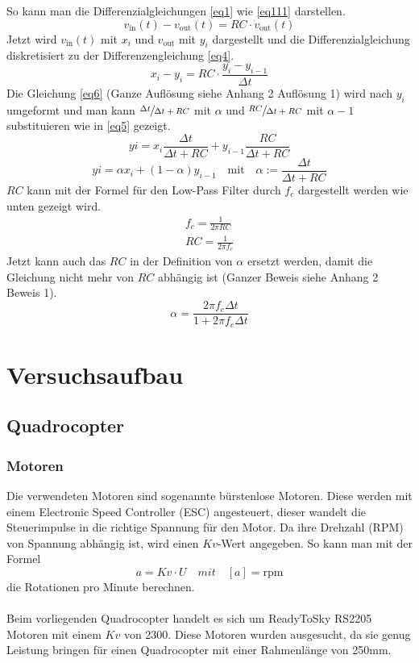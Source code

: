 \documentclass[12pt,a4paper, ngerman]{article}
\begin{document}
So kann man die Differenzialgleichungen \ref{eq1} wie \ref{eq111} darstellen.\\
\begin{equation} \label{eq111}
v_{\text{in}}(t)-v_{\text{out}}(t)=RC\cdot \dot{v}_{\text{out}}(t)
\end{equation}
Jetzt wird $v_{\text{in}}(t)$ mit $x_{i}$ und $v_{\text{out}}$ mit $y_{i}$ dargestellt und die Differenzialgleichung diskretisiert zu der Differenzengleichung \ref{eq4}.
\begin{equation}\label{eq4}
x_{i}-y_{i}=RC\cdot \frac{y_{i}-y_{i-1}}{\Delta t}
\end{equation}
\newpage
\noindent
Die Gleichung \ref{eq6} (Ganze Auflösung siehe Anhang 2 Auflösung 1) wird nach $y_{i}$ umgeformt und man kann $\sfrac{\Delta t}{\Delta t+RC}$  mit $\alpha$ und $\sfrac{RC}{\Delta t + RC}$ mit $\alpha-1$ substituieren wie in \ref{eq5} gezeigt.
\begin{equation} \label{eq6}
y{i}=x_{i}\frac{\Delta t}{\Delta t+RC} + y_{i-1}\frac{RC}{\Delta t+RC}
\end{equation} 
\begin{equation}\label{eq5}
y{i}=\alpha x_{i} + (1-\alpha)y_{i-1} \quad \text{mit} \quad \alpha:=\frac{\Delta t}{\Delta t+RC}
\end{equation}
$RC$ kann mit der Formel für den Low-Pass Filter durch $f_{c}$ dargestellt werden wie unten gezeigt wird.
\begin{align*}
f_{c} = \frac{1}{2\pi RC} \\
RC = \frac{1}{2\pi f_{c}} 
\end{align*}
Jetzt kann auch das $RC$ in der Definition von $\alpha$ ersetzt werden, damit die Gleichung nicht mehr von $RC$ abhängig ist (Ganzer Beweis siehe Anhang 2 Beweis 1).
\begin{equation*}
\alpha = \frac{2\pi f_{c}\Delta t}{1+2\pi f_{c}\Delta t} 
\end{equation*}
\newpage
\section{Versuchsaufbau}
\subsection{Quadrocopter}
\subsubsection{Motoren}
Die verwendeten Motoren sind sogenannte bürstenlose Motoren. Diese werden mit einem Electronic Speed Controller (ESC) angesteuert, dieser wandelt die Steuerimpulse in die richtige Spannung für den Motor. Da ihre Drehzahl (RPM) von Spannung abhängig ist, wird einen $Kv$-Wert angegeben. So kann man mit der Formel
\begin{equation}
a=Kv\cdot U \quad mit \quad [a]=\text{rpm}
\end{equation}
die Rotationen pro Minute berechnen.\\ \\
Beim vorliegenden Quadrocopter handelt es sich um ReadyToSky RS2205 Motoren mit einem $Kv$ von 2300. Diese Motoren wurden ausgesucht, da sie genug Leistung bringen für einen Quadrocopter mit einer Rahmenlänge von 250mm.
\end{document}
